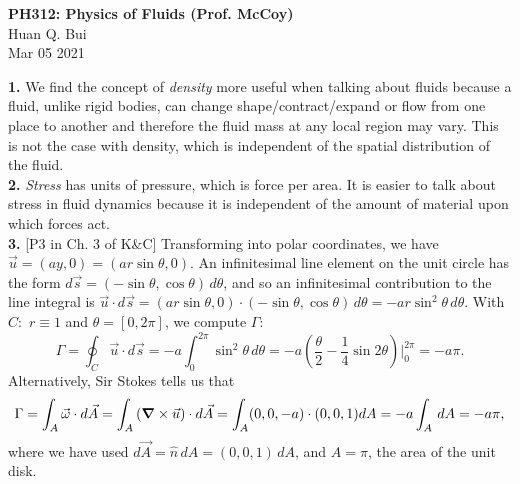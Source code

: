 \documentclass[11pt]{article}
\begin{document}
\begin{center}
{\large \bf PH312: Physics of Fluids (Prof. McCoy)}\\
{ Huan Q. Bui}\\
Mar 05 2021
\end{center}

\noindent \textbf{1.} We find the concept of \textit{density} more useful when talking about fluids because a fluid, unlike rigid bodies, can change shape/contract/expand or flow from one place to another and therefore the fluid mass at any local region may vary. This is not the case with density, which is independent of the spatial distribution of the fluid. \\ 




\noindent \textbf{2.} \textit{Stress} has units of pressure, which is force per area. It is easier to talk about stress in fluid dynamics because it is independent of the amount of material upon which forces act.  \\


\noindent \textbf{3.} [P3 in Ch. 3 of K\&C] Transforming into polar coordinates, we have $\vec{u} = (ay,0) = (ar\sin\theta,0)$. An infinitesimal line element on the unit circle has the form $d\vec{s} = (-\sin\theta,\cos\theta)\,d\theta$, and so an infinitesimal contribution to the line integral is $\vec{u} \cdot d\vec{s} = (ar\sin\theta,0)\cdot (-\sin\theta,\cos\theta) \, d\theta= -ar\sin^2\theta\,d\theta$. With $C:$ $r\equiv 1$ and $\theta = [0,2\pi]$, we compute $\Gamma$:
\begin{equation*}
\Gamma = \oint_C \vec{u}\cdot d\vec{s} = -a\int^{2\pi}_0  \sin^2\theta \,d\theta = -a\left( \frac{\theta}{2} - \frac{1}{4}\sin2\theta \right)\bigg\vert_0^{2\pi} = -a\pi. 
\end{equation*}
Alternatively, Sir Stokes tells us that
\begin{equation*}
\Gamma = \int_A \vec{\omega} \cdot d\vec{A} = \int_A \left(\grad \times \vec{u}\right)\cdot d\vec{A} = \int_A (0,0,-a)\cdot (0,0,1) dA = -a\int_A \,dA = -a\pi,
\end{equation*}
where we have used $d\vec{A} = \hat{n}\,dA = (0,0,1)\,dA$, and $A = \pi$, the area of the unit disk. \\
\end{document}
